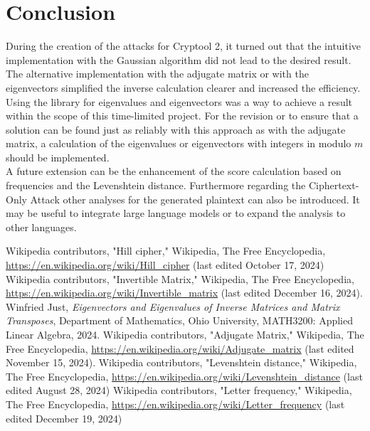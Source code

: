 \documentclass[conference]{IEEEtran}
\begin{document}
\section{Conclusion}

During the creation of the attacks for Cryptool 2, it turned out that the intuitive implementation with the Gaussian algorithm did not lead to the desired result. The alternative implementation with the adjugate matrix or with the eigenvectors simplified the inverse calculation clearer and  increased the efficiency. Using the library for eigenvalues and eigenvectors was a way to achieve a result within the scope of this time-limited project. For the revision or to ensure that a solution can be found just as reliably with this approach as with the adjugate matrix, a calculation of the eigenvalues or eigenvectors with integers in modulo \( m \) should be implemented.
\\
A future extension can be the enhancement of the score calculation based on frequencies and the Levenshtein distance.
Furthermore regarding the Ciphertext-Only Attack other analyses for the generated plaintext can also be introduced. It may be useful to integrate large language models or to expand the analysis to other languages.
\\

\begin{thebibliography}{9}
 Wikipedia contributors, "Hill cipher," Wikipedia, The Free Encyclopedia, \url{https://en.wikipedia.org/wiki/Hill_cipher} (last edited October 17, 2024)
 Wikipedia contributors, "Invertible Matrix," Wikipedia, The Free Encyclopedia, \url{https://en.wikipedia.org/wiki/Invertible_matrix} (last edited December 16, 2024).
 Winfried Just, \textit{Eigenvectors and Eigenvalues of Inverse Matrices and Matrix Transposes}, Department of Mathematics, Ohio University, MATH3200: Applied Linear Algebra, 2024.
 Wikipedia contributors, "Adjugate Matrix," Wikipedia, The Free Encyclopedia, \url{https://en.wikipedia.org/wiki/Adjugate_matrix} (last edited November 15, 2024).
 Wikipedia contributors, "Levenshtein distance," Wikipedia, The Free Encyclopedia, \url{https://en.wikipedia.org/wiki/Levenshtein_distance} (last edited August 28, 2024)
 Wikipedia contributors, "Letter frequency," Wikipedia, The Free Encyclopedia, \url{https://en.wikipedia.org/wiki/Letter_frequency} (last edited December 19, 2024)
\end{thebibliography}
\end{document}

